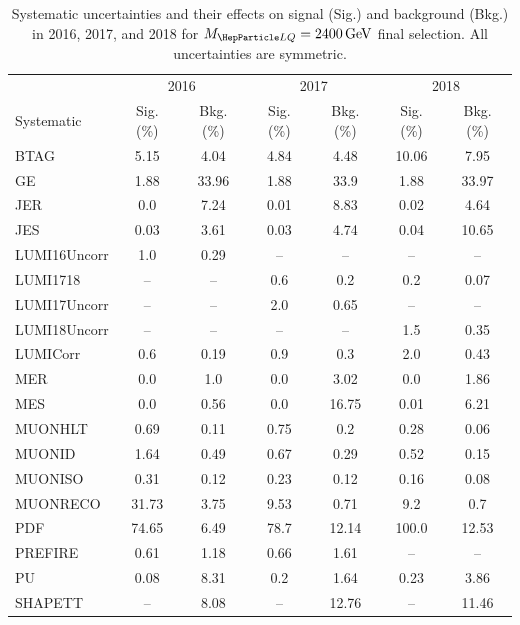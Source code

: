 \begin{table}[H]
	\begin{center}
        \begin{footnotesize}
			\caption{Systematic uncertainties and their effects on signal (Sig.) and background (Bkg.) in 2016, 2017, and 2018 for $\MLQ = \SI{2400}{GeV}$ final selection. All uncertainties are symmetric.}
			\begin{tabular}{lcccccc} \hline \hline
				& \multicolumn{2}{c}{2016} & \multicolumn{2}{c}{2017} & \multicolumn{2}{c}{2018} \\
				Systematic & Sig. (\%) & Bkg. (\%) & Sig. (\%) & Bkg. (\%) & Sig. (\%) & Bkg. (\%) \\ \hline
				BTAG &  5.15  &  4.04 &  4.84  &  4.48 &  10.06  &  7.95 \\
				GE &  1.88  &  33.96 &  1.88  &  33.9 &  1.88  &  33.97 \\
				JER &  0.0  &  7.24 &  0.01  &  8.83 &  0.02  &  4.64 \\
				JES &  0.03  &  3.61 &  0.03  &  4.74 &  0.04  &  10.65 \\
				LUMI16Uncorr &  1.0  &  0.29 & -- & -- & -- & -- \\
				LUMI1718 & -- & -- &  0.6  &  0.2 &  0.2  &  0.07 \\
				LUMI17Uncorr & -- & -- &  2.0  &  0.65 & -- & -- \\
				LUMI18Uncorr & -- & -- & -- & -- &  1.5  &  0.35 \\
				LUMICorr &  0.6  &  0.19 &  0.9  &  0.3 &  2.0  &  0.43 \\
				MER &  0.0  &  1.0 &  0.0  &  3.02 &  0.0  &  1.86 \\
				MES &  0.0  &  0.56 &  0.0  &  16.75 &  0.01  &  6.21 \\
				MUONHLT &  0.69  &  0.11 &  0.75  &  0.2 &  0.28  &  0.06 \\
				MUONID &  1.64  &  0.49 &  0.67  &  0.29 &  0.52  &  0.15 \\
				MUONISO &  0.31  &  0.12 &  0.23  &  0.12 &  0.16  &  0.08 \\
				MUONRECO &  31.73  &  3.75 &  9.53  &  0.71 &  9.2  &  0.7 \\
				PDF &  74.65  &  6.49 &  78.7  &  12.14 &  100.0  &  12.53 \\
				PREFIRE &  0.61  &  1.18 &  0.66  &  1.61 & -- & -- \\
				PU &  0.08  &  8.31 &  0.2  &  1.64 &  0.23  &  3.86 \\
				SHAPETT & -- &  8.08 & -- &  12.76 & -- &  11.46 \\

\end{tabular}
\end{footnotesize}
\end{center}
\end{table}
